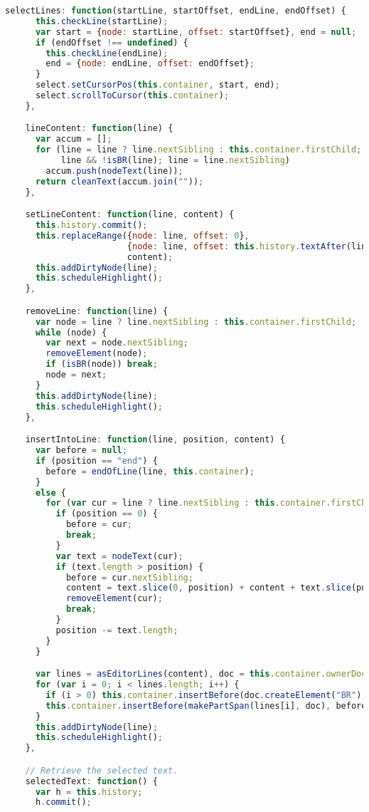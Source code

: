 \begin{lstlisting}[language=Javascript]
    selectLines: function(startLine, startOffset, endLine, endOffset) {
      this.checkLine(startLine);
      var start = {node: startLine, offset: startOffset}, end = null;
      if (endOffset !== undefined) {
        this.checkLine(endLine);
        end = {node: endLine, offset: endOffset};
      }
      select.setCursorPos(this.container, start, end);
      select.scrollToCursor(this.container);
    },

    lineContent: function(line) {
      var accum = [];
      for (line = line ? line.nextSibling : this.container.firstChild;
           line && !isBR(line); line = line.nextSibling)
        accum.push(nodeText(line));
      return cleanText(accum.join(""));
    },

    setLineContent: function(line, content) {
      this.history.commit();
      this.replaceRange({node: line, offset: 0},
                        {node: line, offset: this.history.textAfter(line).length},
                        content);
      this.addDirtyNode(line);
      this.scheduleHighlight();
    },

    removeLine: function(line) {
      var node = line ? line.nextSibling : this.container.firstChild;
      while (node) {
        var next = node.nextSibling;
        removeElement(node);
        if (isBR(node)) break;
        node = next;
      }
      this.addDirtyNode(line);
      this.scheduleHighlight();
    },

    insertIntoLine: function(line, position, content) {
      var before = null;
      if (position == "end") {
        before = endOfLine(line, this.container);
      }
      else {
        for (var cur = line ? line.nextSibling : this.container.firstChild; cur; cur = cur.nextSibling) {
          if (position == 0) {
            before = cur;
            break;
          }
          var text = nodeText(cur);
          if (text.length > position) {
            before = cur.nextSibling;
            content = text.slice(0, position) + content + text.slice(position);
            removeElement(cur);
            break;
          }
          position -= text.length;
        }
      }

      var lines = asEditorLines(content), doc = this.container.ownerDocument;
      for (var i = 0; i < lines.length; i++) {
        if (i > 0) this.container.insertBefore(doc.createElement("BR"), before);
        this.container.insertBefore(makePartSpan(lines[i], doc), before);
      }
      this.addDirtyNode(line);
      this.scheduleHighlight();
    },

    // Retrieve the selected text.
    selectedText: function() {
      var h = this.history;
      h.commit();


\end{lstlisting}
